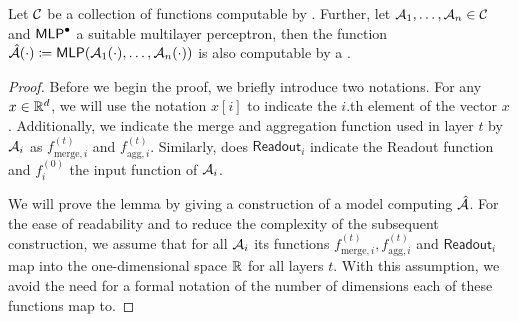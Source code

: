 \begin{lemma}\label{lem:composition_lemma_gnn}
    Let $\mathcal{C}$ be a collection of functions computable by \gnns. Further, let  $\mathcal{A}_1, \dots , \mathcal{A}_n \in \mathcal{C}$ and $\textsf{MLP}^\bullet$ a suitable multilayer perceptron, then the function $\hat{\mathcal{A}}(\cdot) \coloneqq \textsf{MLP}(\mathcal{A}_1(\cdot), \dots, \mathcal{A}_n(\cdot))$ is also computable by a \gnn.
\end{lemma}

\begin{proof}
    Before we begin the proof, we briefly introduce two notations. For any $x \in \mathbb{R}^d$, we will use the notation $x[i]$ to indicate the $i$.th element of the vector $x$. Additionally, we indicate the merge and aggregation function used in layer $t$ by $\mathcal{A}_i$ as $f^{(t)}_{\text{merge}, i}$ and $f^{(t)}_{\text{agg}, i}$. Similarly, does $\textsf{Readout}_i$ indicate the \textsf{Readout} function and $f^{(0)}_i$ the input function of $\mathcal{A}_i$.
    
    We will prove the lemma by giving a construction of a \gnn model computing $\hat{\mathcal{A}}$. For the ease of readability and to reduce the complexity of the subsequent construction, we assume that for all $\mathcal{A}_i$ its functions $f^{(t)}_{\text{merge}, i}, f^{(t)}_{\text{agg}, i}$ and $\textsf{Readout}_i$ map into the one-dimensional space $\mathbb{R}$ for all layers $t$. With this assumption, we avoid the need for a formal notation of the number of dimensions each of these functions map to.


\end{proof}
